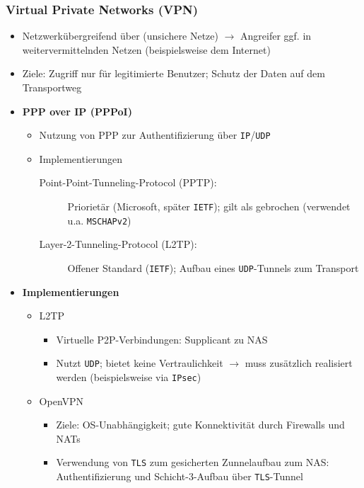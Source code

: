 \subsubsection{Virtual Private Networks (VPN)}
\begin{itemize}
	\item Netzwerkübergreifend über (unsichere Netze) \(\rightarrow\) Angreifer ggf. in weitervermittelnden Netzen (beispielsweise dem Internet)
	\item Ziele: Zugriff nur für legitimierte Benutzer; Schutz der Daten auf dem Transportweg
	\item \textbf{PPP over IP (PPPoI)}
	\begin{itemize}
		\item Nutzung von PPP zur Authentifizierung über \texttt{IP}/\texttt{UDP}
		\item Implementierungen
		\begin{description}
			\item[Point-Point-Tunneling-Protocol (PPTP):] Priorietär (Microsoft, später \texttt{IETF}); gilt als gebrochen (verwendet u.a. \texttt{MSCHAPv2})
			\item[Layer-2-Tunneling-Protocol (L2TP):] Offener Standard (\texttt{IETF}); Aufbau eines \texttt{UDP}-Tunnels zum Transport
		\end{description}
	\end{itemize}
	\item \textbf{Implementierungen}
	\begin{itemize}
		\item L2TP
		\begin{itemize}
			\item Virtuelle P2P-Verbindungen: Supplicant zu NAS
			\item Nutzt \texttt{UDP}; bietet keine Vertraulichkeit \(\rightarrow\) muss zusätzlich realisiert werden (beispielsweise via \texttt{IPsec})
		\end{itemize}
		\item OpenVPN
		\begin{itemize}
			\item Ziele: OS-Unabhängigkeit; gute Konnektivität durch Firewalls und NATs
			\item Verwendung von \texttt{TLS} zum gesicherten Zunnelaufbau zum NAS: Authentifizierung und Schicht-3-Aufbau über \texttt{TLS}-Tunnel
		\end{itemize}
	\end{itemize}
\end{itemize}

